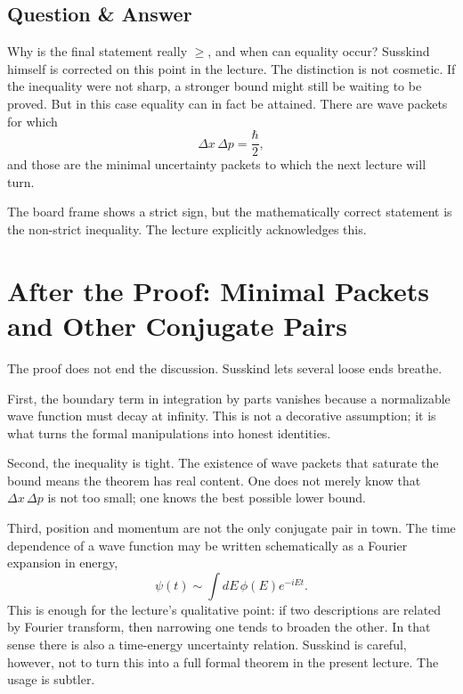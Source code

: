 \subsection{Question \& Answer}

Why is the final statement really \(\ge\), and when can equality occur? Susskind himself is corrected on this point in the lecture. The distinction is not cosmetic. If the inequality were not sharp, a stronger bound might still be waiting to be proved. But in this case equality can in fact be attained. There are wave packets for which
\begin{equation}
\Delta x\,\Delta p=\frac{\hbar}{2},
\end{equation}
and those are the minimal uncertainty packets to which the next lecture will turn.

\begin{remark}
The board frame shows a strict sign, but the mathematically correct statement is the non-strict inequality. The lecture explicitly acknowledges this.
\end{remark}

\section{After the Proof: Minimal Packets and Other Conjugate Pairs}

The proof does not end the discussion. Susskind lets several loose ends breathe.

First, the boundary term in integration by parts vanishes because a normalizable wave function must decay at infinity. This is not a decorative assumption; it is what turns the formal manipulations into honest identities.

Second, the inequality is tight. The existence of wave packets that saturate the bound means the theorem has real content. One does not merely know that \(\Delta x\,\Delta p\) is not too small; one knows the best possible lower bound.

Third, position and momentum are not the only conjugate pair in town. The time dependence of a wave function may be written schematically as a Fourier expansion in energy,
\begin{equation}
\psi(t)\sim \int dE\,\phi(E)e^{-iEt}.
\end{equation}
This is enough for the lecture's qualitative point: if two descriptions are related by Fourier transform, then narrowing one tends to broaden the other. In that sense there is also a time-energy uncertainty relation. Susskind is careful, however, not to turn this into a full formal theorem in the present lecture. The usage is subtler.

